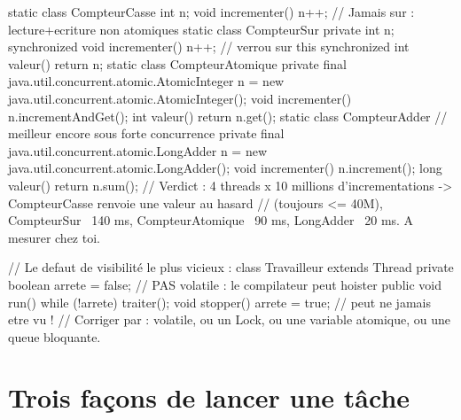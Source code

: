 \documentclass[12pt,a4paper,twoside,openright]{book}
\begin{document}
\begin{codejava}
static class CompteurCasse { int n; void incrementer() { n++; } }     // Jamais sur : lecture+ecriture non atomiques
static class CompteurSur {
    private int n;
    synchronized void incrementer() { n++; }                     // verrou sur this
    synchronized int valeur() { return n; }
}
static class CompteurAtomique {
    private final java.util.concurrent.atomic.AtomicInteger n = new java.util.concurrent.atomic.AtomicInteger();
    void incrementer() { n.incrementAndGet(); }
    int valeur() { return n.get(); }
}
static class CompteurAdder {                                      // meilleur encore sous forte concurrence
    private final java.util.concurrent.atomic.LongAdder n = new java.util.concurrent.atomic.LongAdder();
    void incrementer() { n.increment(); }
    long valeur() { return n.sum(); }
}
// Verdict : 4 threads x 10 millions d'incrementations -> CompteurCasse renvoie une valeur au hasard
// (toujours <= 40M), CompteurSur ~140 ms, CompteurAtomique ~90 ms, LongAdder ~20 ms. A mesurer chez toi.

// Le defaut de visibilit\'e le plus vicieux :
class Travailleur extends Thread {
    private boolean arrete = false;                       // PAS volatile : le compilateur peut hoister
    public void run() { while (!arrete) { traiter(); } }
    void stopper() { arrete = true; }                      // peut ne jamais etre vu !
}
// Corriger par : volatile, ou un Lock, ou une variable atomique, ou une queue bloquante.
\end{codejava}

\section{Trois fa\c{c}ons de lancer une t\^ache}
\end{document}
